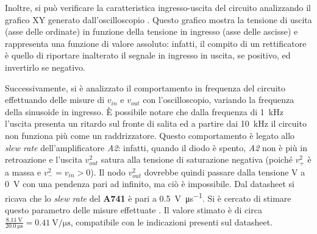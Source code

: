 \noindent
Inoltre, si può verificare la caratteristica ingresso-uscita del circuito analizzando il grafico XY generato dall'oscilloscopio . Questo grafico mostra la tensione di uscita (asse delle ordinate) in funzione della tensione in ingresso (asse delle ascisse) e rappresenta una funzione di valore assoluto: infatti, il compito di un rettificatore è quello di riportare inalterato il segnale in ingresso in uscita, se positivo, ed invertirlo se negativo.

\noindent
Successivamente, si è analizzato il comportamento in frequenza del circuito effettuando delle misure di $v_{in}$ e $v_{out}$ con l'oscilloscopio, variando la frequenza della sinusoide in ingresso. 
\`E possibile notare che dalla frequenza di \SI{1}{\kilo\hertz} l'uscita presenta un ritardo sul fronte di salita ed a partire dai \SI{10}{\kilo\hertz} il circuito non funziona più come un raddrizzatore. Questo comportamento è legato allo \textit{slew rate} dell'amplificatore \textit{A2}: infatti, quando il diodo è spento, \textit{A2} non è più in retroazione e l'uscita $v_{out}^2$ satura alla tensione di saturazione negativa (poiché $v_+^2$ è a massa e $v_-^2=v_{in}>0$). Il nodo $v_{out}^2$ dovrebbe quindi passare dalla tensione V a \SI{0}{\volt} con una pendenza pari ad infinito, ma ciò è impossibile. Dal datasheet si ricava che lo \textit{slew rate} del \textbf{\textmu A741} è pari a \SI{0.5}{\volt\per\micro\second}. Si è cercato di stimare questo parametro delle misure effettuate . Il valore stimato è di circa $\frac{\SI{8.11}{\volt}}{\SI{20.0}{\micro\second}}=\SI{0.41}{\volt\per\micro\second}$, compatibile con le indicazioni presenti sul datasheet.

